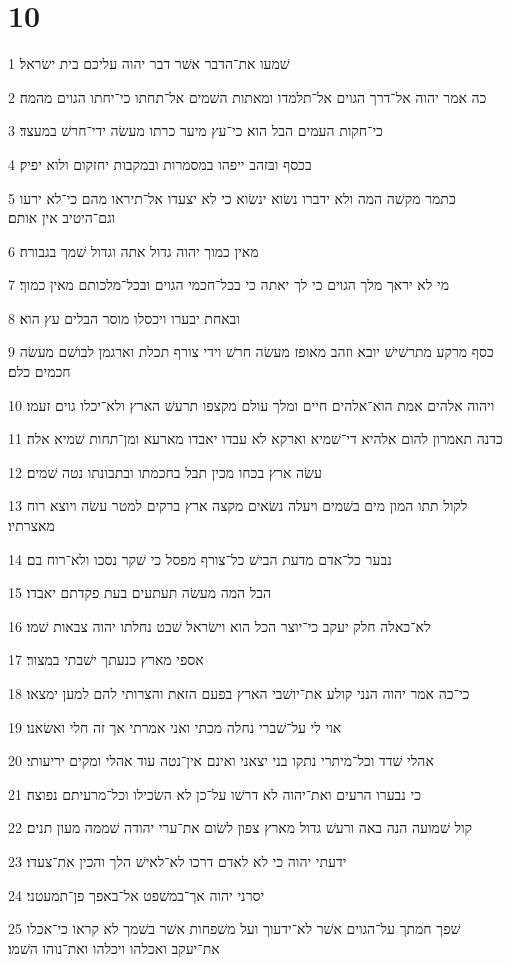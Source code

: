 \chapter{10}

\par 1 שׁמעו את־הדבר אשׁר דבר יהוה עליכם בית ישׂראל׃
\par 2 כה אמר יהוה אל־דרך הגוים אל־תלמדו ומאתות השׁמים אל־תחתו כי־יחתו הגוים מהמה׃
\par 3 כי־חקות העמים הבל הוא כי־עץ מיער כרתו מעשׂה ידי־חרשׁ במעצד׃
\par 4 בכסף ובזהב ייפהו במסמרות ובמקבות יחזקום ולוא יפיק׃
\par 5 כתמר מקשׁה המה ולא ידברו נשׂוא ינשׂוא כי לא יצעדו אל־תיראו מהם כי־לא ירעו וגם־היטיב אין אותם׃
\par 6 מאין כמוך יהוה גדול אתה וגדול שׁמך בגבורה׃
\par 7 מי לא יראך מלך הגוים כי לך יאתה כי בכל־חכמי הגוים ובכל־מלכותם מאין כמוך׃
\par 8 ובאחת יבערו ויכסלו מוסר הבלים עץ הוא׃
\par 9 כסף מרקע מתרשׁישׁ יובא וזהב מאופז מעשׂה חרשׁ וידי צורף תכלת וארגמן לבושׁם מעשׂה חכמים כלם׃
\par 10 ויהוה אלהים אמת הוא־אלהים חיים ומלך עולם מקצפו תרעשׁ הארץ ולא־יכלו גוים זעמו׃
\par 11 כדנה תאמרון להום אלהיא די־שׁמיא וארקא לא עבדו יאבדו מארעא ומן־תחות שׁמיא אלה׃
\par 12 עשׂה ארץ בכחו מכין תבל בחכמתו ובתבונתו נטה שׁמים׃
\par 13 לקול תתו המון מים בשׁמים ויעלה נשׂאים מקצה ארץ ברקים למטר עשׂה ויוצא רוח מאצרתיו׃
\par 14 נבער כל־אדם מדעת הבישׁ כל־צורף מפסל כי שׁקר נסכו ולא־רוח בם׃
\par 15 הבל המה מעשׂה תעתעים בעת פקדתם יאבדו׃
\par 16 לא־כאלה חלק יעקב כי־יוצר הכל הוא וישׂראל שׁבט נחלתו יהוה צבאות שׁמו׃
\par 17 אספי מארץ כנעתך ישׁבתי במצור׃
\par 18 כי־כה אמר יהוה הנני קולע את־יושׁבי הארץ בפעם הזאת והצרותי להם למען ימצאו׃
\par 19 אוי לי על־שׁברי נחלה מכתי ואני אמרתי אך זה חלי ואשׂאנו׃
\par 20 אהלי שׁדד וכל־מיתרי נתקו בני יצאני ואינם אין־נטה עוד אהלי ומקים יריעותי׃
\par 21 כי נבערו הרעים ואת־יהוה לא דרשׁו על־כן לא השׂכילו וכל־מרעיתם נפוצה׃
\par 22 קול שׁמועה הנה באה ורעשׁ גדול מארץ צפון לשׂום את־ערי יהודה שׁממה מעון תנים׃
\par 23 ידעתי יהוה כי לא לאדם דרכו לא־לאישׁ הלך והכין את־צעדו׃
\par 24 יסרני יהוה אך־במשׁפט אל־באפך פן־תמעטני׃
\par 25 שׁפך חמתך על־הגוים אשׁר לא־ידעוך ועל משׁפחות אשׁר בשׁמך לא קראו כי־אכלו את־יעקב ואכלהו ויכלהו ואת־נוהו השׁמו׃

